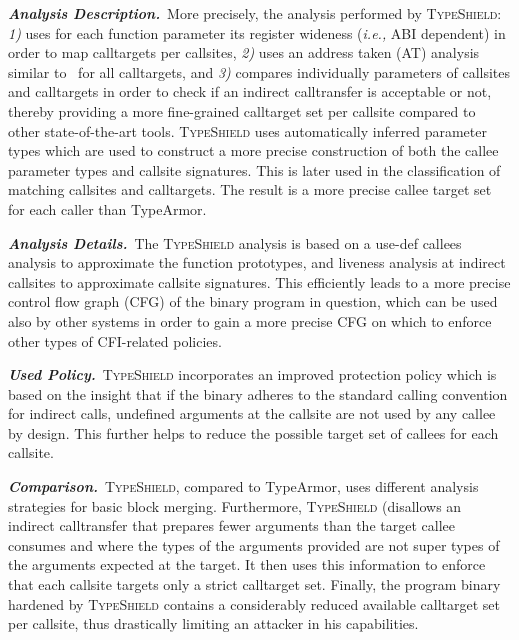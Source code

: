 \textbf{\textit{Analysis Description.}}~More precisely, the analysis performed by \textsc{TypeShield}:
\textit{1)} uses for each function parameter its register wideness (\textit{i.e.,} ABI dependent) in order to map calltargets per callsites,  
\textit{2)} uses an address taken (AT) analysis similar to~\cite{veen:typearmor} for all calltargets, and 
\textit{3)} compares individually parameters of callsites and calltargets in order to check if an indirect calltransfer is acceptable or not, 
thereby providing a more fine-grained calltarget set per callsite compared to other state-of-the-art tools.
\textsc{TypeShield} uses automatically inferred parameter types which are used to construct
a more precise construction of both the callee parameter types and callsite signatures. This 
is later used in the classification of matching callsites and calltargets.
The result is a more precise callee target set for each caller than TypeArmor.

\textbf{\textit{Analysis Details.}}~The \textsc{TypeShield} analysis is based on a use-def callees analysis to approximate the function prototypes, 
and liveness analysis at indirect callsites to approximate callsite signatures. This 
efficiently leads to a more precise control flow graph (CFG) of the binary program in question, 
which can be used also by other systems in order to gain a more precise CFG on which to 
enforce other types of CFI-related policies.

\textbf{\textit{Used Policy.}}~\textsc{TypeShield} incorporates an improved protection policy which is
based on the insight that if the binary adheres to the standard calling convention
for indirect calls, undefined arguments at the callsite are not used by any callee by design. 
This further helps to reduce the possible target set of callees for each callsite.

\textbf{\textit{Comparison.}}~\textsc{TypeShield}, compared to TypeArmor, uses different analysis strategies for basic block merging.
Furthermore, \textsc{TypeShield}  (disallows an indirect calltransfer that prepares
fewer arguments than the target callee consumes and where the types of the 
arguments provided are not super types of the arguments expected at the target.
It then uses this information to enforce that each callsite targets only a strict calltarget set.
Finally, the program binary hardened by \textsc{TypeShield} contains a considerably reduced available calltarget set per callsite,
thus drastically limiting an attacker in his capabilities.

